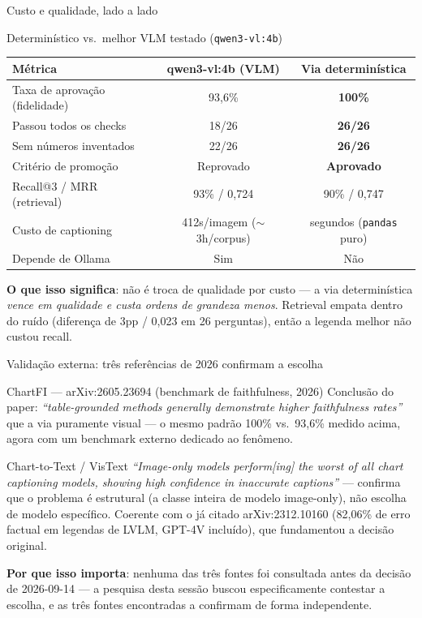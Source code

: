 \documentclass{beamer}
\newenvironment{numerobloco}[1]{\begin{block}{#1}}{\end{block}}
\begin{document}
\begin{frame}{Custo e qualidade, lado a lado}
  \small
  \begin{numerobloco}{Determinístico vs.\ melhor VLM testado (\texttt{qwen3-vl:4b})}
    \begin{center}
    \footnotesize
    \begin{tabular}{lcc}
      \toprule
      \textbf{Métrica} & \textbf{qwen3-vl:4b (VLM)} & \textbf{Via determinística} \\
      \midrule
      Taxa de aprovação (fidelidade) & 93,6\% & \textbf{100\%} \\
      Passou todos os checks & 18/26 & \textbf{26/26} \\
      Sem números inventados & 22/26 & \textbf{26/26} \\
      Critério de promoção & Reprovado & \textbf{Aprovado} \\
      Recall@3 / MRR (retrieval) & 93\% / 0,724 & 90\% / 0,747 \\
      Custo de captioning & 412s/imagem ($\sim$3h/corpus) & segundos (\texttt{pandas} puro) \\
      Depende de Ollama & Sim & Não \\
      \bottomrule
    \end{tabular}
    \end{center}
  \end{numerobloco}

  \pause
  \textbf{O que isso significa}: não é troca de qualidade por custo — a via determinística
  \emph{vence em qualidade e custa ordens de grandeza menos}. Retrieval empata dentro do
  ruído (diferença de 3pp / 0,023 em 26 perguntas), então a legenda melhor não custou recall.
\end{frame}

\begin{frame}{Validação externa: três referências de 2026 confirmam a escolha}
  \small
  \begin{numerobloco}{ChartFI — arXiv:2605.23694 (benchmark de faithfulness, 2026)}
    Conclusão do paper: \emph{``table-grounded methods generally demonstrate higher
    faithfulness rates''} que a via puramente visual — o mesmo padrão 100\% vs.\ 93,6\%
    medido acima, agora com um benchmark externo dedicado ao fenômeno.
  \end{numerobloco}

  \pause
  \begin{numerobloco}{Chart-to-Text / VisText}
    \emph{``Image-only models perform[ing] the worst of all chart captioning models,
    showing high confidence in inaccurate captions''} — confirma que o problema é
    estrutural (a classe inteira de modelo image-only), não escolha de modelo específico.
    Coerente com o já citado arXiv:2312.10160 (82,06\% de erro factual em legendas de LVLM,
    GPT-4V incluído), que fundamentou a decisão original.
  \end{numerobloco}

  \pause
  \textbf{Por que isso importa}: nenhuma das três fontes foi consultada antes da decisão de
  2026-09-14 — a pesquisa desta sessão buscou especificamente contestar a escolha, e as três
  fontes encontradas a confirmam de forma independente.
\end{frame}
\end{document}
